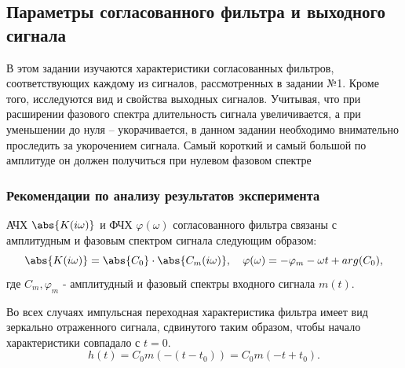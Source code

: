 \subsection{Параметры согласованного фильтра и выходного сигнала}
В этом задании изучаются характеристики согласованных фильтров,
соответствующих каждому из сигналов, рассмотренных в задании №1. Кроме
того, исследуются вид и свойства выходных сигналов. Учитывая, что при
расширении фазового спектра длительность сигнала увеличивается, а при
уменьшении до нуля – укорачивается, в данном задании необходимо
внимательно проследить за укорочением сигнала. Самый короткий и самый
большой по амплитуде он должен получиться при нулевом фазовом спектре

\subsubsection*{Рекомендации по анализу результатов эксперимента}%
\label{ssub:rekomendatsii_po_analizu}







АЧХ $\abs{K(i \omega)}$ и ФЧХ $\varphi (\omega)$ согласованного фильтра связаны с 
амплитудным и фазовым спектром сигнала следующим образом:
\begin{equation}
    \abs{K(i \omega)} = \abs{C_0} \cdot \abs{C_m(i \omega)}, \quad
    \varphi (\omega) = -\varphi_m  -\omega t + arg(C_0),
\end{equation}
где $C_m, \varphi_m $ - амплитудный и фазовый спектры входного сигнала $m(t)$.

Во всех случаях импульсная переходная характеристика фильтра имеет вид зеркально отраженного сигнала, сдвинутого таким
образом, чтобы начало характеристики совпадало с $t=0$.
\begin{equation}
    h(t) = C_0 m(-(t-t_0)) = C_0 m(-t+t_0).
    \label{eq:}
\end{equation}

